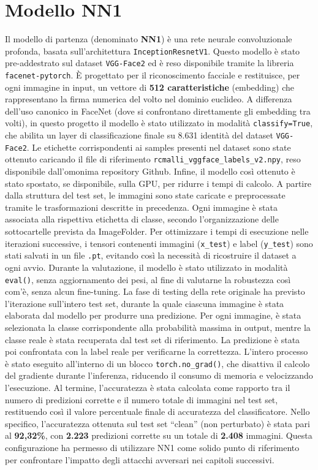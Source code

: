     \section{Modello NN1}
        Il modello di partenza (denominato \textbf{NN1}) è una rete neurale convoluzionale profonda, basata sull’architettura \texttt{InceptionResnetV1}. Questo modello è stato pre-addestrato sul dataset \texttt{VGG-Face2} ed è reso disponibile tramite la libreria \texttt{facenet-pytorch}. È progettato per il riconoscimento facciale e restituisce, per ogni immagine in input, un vettore di \textbf{512 caratteristiche} (embedding) che rappresentano la firma numerica del volto nel dominio euclideo.
        A differenza dell’uso canonico in FaceNet (dove si confrontano direttamente gli embedding tra volti), in questo progetto il modello è stato utilizzato in modalità \verb|classify=True|, che abilita un layer di classificazione finale su 8.631 identità del dataset \texttt{VGG-Face2}. Le etichette corrispondenti ai samples presenti nel dataset sono state ottenuto caricando il file di riferimento \texttt{rcmalli\_vggface\_labels\_v2.npy}, reso disponibile dall'omonima repository Github. Infine, il modello così ottenuto è stato spostato, se disponibile, sulla GPU, per ridurre i tempi di calcolo.
        A partire dalla struttura del test set, le immagini sono state caricate e preprocessate tramite le trasformazioni descritte in precedenza. Ogni immagine è stata associata alla rispettiva etichetta di classe, secondo l’organizzazione delle sottocartelle prevista da ImageFolder. Per ottimizzare i tempi di esecuzione nelle iterazioni successive, i tensori contenenti immagini (\texttt{x\_test}) e label (\texttt{y\_test}) sono stati salvati in un file \texttt{.pt}, evitando così la necessità di ricostruire il dataset a ogni avvio.
        Durante la valutazione, il modello è stato utilizzato in modalità \texttt{eval()}, senza aggiornamento dei pesi, al fine di valutarne la robustezza così com'è, senza alcun fine-tuning. La fase di testing della rete originale ha previsto l’iterazione sull’intero test set, durante la quale ciascuna immagine è stata elaborata dal modello per produrre una predizione. Per ogni immagine, è stata selezionata la classe corrispondente alla probabilità massima in output, mentre la classe reale è stata recuperata dal test set di riferimento. La predizione è stata poi confrontata con la label reale per verificarne la correttezza.
        L’intero processo è stato eseguito all’interno di un blocco \texttt{torch.no\_grad()}, che disattiva il calcolo del gradiente durante l’inferenza, riducendo il consumo di memoria e velocizzando l’esecuzione. Al termine, l’accuratezza è stata calcolata come rapporto tra il numero di predizioni corrette e il numero totale di immagini nel test set, restituendo così il valore percentuale finale di accuratezza del classificatore.
        Nello specifico, l’accuratezza ottenuta sul test set “clean” (non perturbato) è stata pari al \textbf{92{,}32\%}, con \textbf{2.223} predizioni corrette su un totale di \textbf{2.408} immagini.
        Questa configurazione ha permesso di utilizzare NN1 come solido punto di riferimento per confrontare l’impatto degli attacchi avversari nei capitoli successivi.